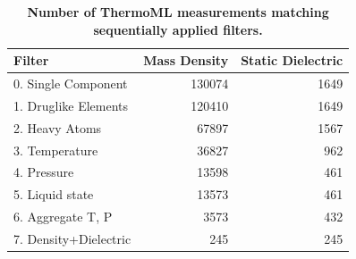 \documentclass[aps,pre,twocolumn,nofootinbib,superscriptaddress,linenumbers]{revtex4-1}
\begin{document}
\begin{table}
\begin{tabular}{lrr}
\toprule
Filter &  Mass Density &  Static Dielectric \\ 
\midrule
0.  Single Component   &               130074 &                                     1649 \\
1.  Druglike Elements  &               120410 &                                     1649 \\
2.  Heavy Atoms        &                67897 &                                     1567 \\
3.  Temperature        &                36827 &                                      962 \\
4.  Pressure           &                13598 &                                      461 \\
5.  Liquid state       &                13573 &                                      461 \\
6.  Aggregate T, P     &                 3573 &                                      432 \\
7.  Density+Dielectric &                  245 &                                      245 \\
\bottomrule
\end{tabular}
\caption{{\bf Number of ThermoML measurements matching sequentially applied filters.}}
\label{table:ThermoMLSummary}
\end{table}
\end{document}
